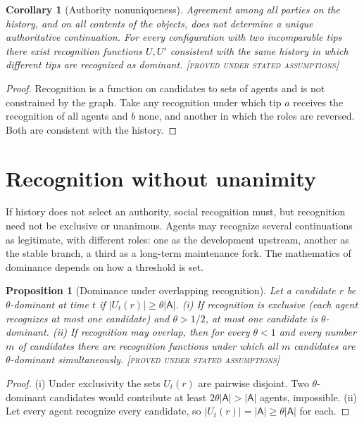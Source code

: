 \documentclass[11pt,twoside,openright]{book}
\theoremstyle{plain}
\newtheorem{proposition}[theorem]{Proposition}
\newtheorem{corollary}[theorem]{Corollary}
\theoremstyle{definition}
\theoremstyle{remark}
\newcommand{\Proved}{\textup{\textsc{[proved under stated assumptions]}}}
\begin{document}
\begin{corollary}[Authority nonuniqueness]\label{cor:nonunique}
Agreement among all parties on the history, and on all contents of the objects, does not determine a unique authoritative continuation. For every configuration with two incomparable tips there exist recognition functions $U,U'$ consistent with the same history in which different tips are recognized as dominant.
\Proved{}
\end{corollary}

\begin{proof}
Recognition is a function on candidates to sets of agents and is not constrained by the graph. Take any recognition under which tip $a$ receives the recognition of all agents and $b$ none, and another in which the roles are reversed. Both are consistent with the history.
\end{proof}

\section{Recognition without unanimity}

If history does not select an authority, social recognition must, but recognition need not be exclusive or unanimous. Agents may recognize several continuations as legitimate, with different roles: one as the development upstream, another as the stable branch, a third as a long-term maintenance fork. The mathematics of dominance depends on how a threshold is set.

\begin{proposition}[Dominance under overlapping recognition]\label{prop:dominance}
Let a candidate $r$ be \emph{$\theta$-dominant} at time $t$ if $|U_t(r)|\ge\theta|\mathsf{A}|$. (i) If recognition is exclusive (each agent recognizes at most one candidate) and $\theta>1/2$, at most one candidate is $\theta$-dominant. (ii) If recognition may overlap, then for every $\theta<1$ and every number $m$ of candidates there are recognition functions under which all $m$ candidates are $\theta$-dominant simultaneously.
\Proved{}
\end{proposition}

\begin{proof}
(i) Under exclusivity the sets $U_t(r)$ are pairwise disjoint. Two $\theta$-dominant candidates would contribute at least $2\theta|\mathsf{A}|>|\mathsf{A}|$ agents, impossible. (ii) Let every agent recognize every candidate, so $|U_t(r)|=|\mathsf{A}|\ge\theta|\mathsf{A}|$ for each.
\end{proof}
\end{document}
